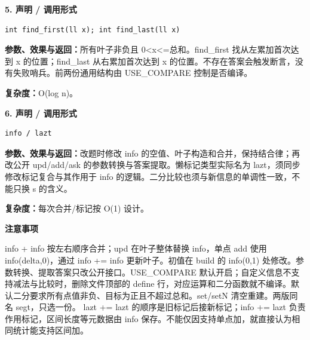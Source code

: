 \documentclass[UTF8,a4paper,10pt]{ctexart}
\newcommand{\TemplNote}[1]{\textbf{注意事项}\par #1\par}
\begin{document}
\noindent\begin{minipage}{\textwidth}
\textbf{5. 声明 / 调用形式}
\begin{lstlisting}
int find_first(ll x); int find_last(ll x)
\end{lstlisting}
\textbf{参数、效果与返回：}所有叶子非负且 0<x<=总和。find\_first 找从左累加首次达到 x 的位置；find\_last 从右累加首次达到 x 的位置。不存在答案会触发断言，没有失败哨兵。前两份通用结构由 USE\_COMPARE 控制是否编译。

\textbf{复杂度：}O(log n)。

\end{minipage}\par\vspace{0.4em}
\noindent\begin{minipage}{\textwidth}
\textbf{6. 声明 / 调用形式}
\begin{lstlisting}
info / lazt
\end{lstlisting}
\textbf{参数、效果与返回：}改题时修改 info 的空值、叶子构造和合并，保持结合律；再改公开 upd/add/ask 的参数转换与答案提取。懒标记类型实际名为 lazt，须同步修改标记复合与其作用于 info 的逻辑。二分比较也须与新信息的单调性一致，不能只换 s 的含义。

\textbf{复杂度：}每次合并/标记按 O(1) 设计。

\TemplNote{info + info 按左右顺序合并；upd 在叶子整体替换 info，单点 add 使用 info(delta,0)，通过 info += info 更新叶子。初值在 build 的 info(0,1) 处修改。参数转换、提取答案只改公开接口。USE\_COMPARE 默认开启；自定义信息不支持减法与比较时，删除文件顶部的 define 行，对应运算和二分函数就不编译。默认二分要求所有点值非负、目标为正且不超过总和。set/setN 清空重建。两版同名 segt，只选一份。 lazt += lazt 的顺序是旧标记后接新标记；info += lazt 负责作用标记，区间长度等元数据由 info 保存。不能仅因支持单点加，就直接认为相同统计能支持区间加。}
\end{minipage}\par\vspace{0.4em}
\end{document}
